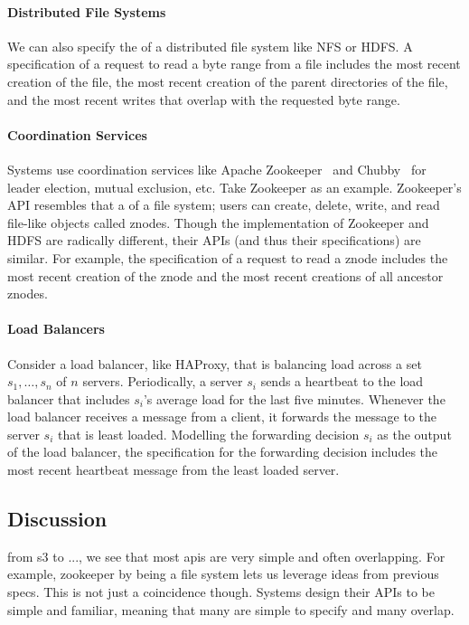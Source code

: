 \paragraph{Distributed File Systems}
We can also specify the \watprovenance{} of a distributed file system like NFS
or HDFS. A \watprovenance{} specification of a request to read a byte range
from a file includes the most recent creation of the file, the most recent
creation of the parent directories of the file, and the most recent writes that
overlap with the requested byte range.

\paragraph{Coordination Services}
Systems use coordination services like Apache
Zookeeper~\cite{hunt2010zookeeper} and Chubby~\cite{burrows2006chubby} for
leader election, mutual exclusion, etc. Take Zookeeper as an example.
Zookeeper's API resembles that a of a file system; users can create, delete,
write, and read file-like objects called znodes. Though the implementation of
Zookeeper and HDFS are radically different, their APIs (and thus their
\watprovenance{} specifications) are similar. For example, the \watprovenance{}
specification of a request to read a znode includes the most recent creation of
the znode and the most recent creations of all ancestor znodes.

\paragraph{Load Balancers}
Consider a load balancer, like HAProxy, that is balancing load across a set
$s_1, \ldots, s_n$ of $n$ servers. Periodically, a server $s_i$ sends a
heartbeat to the load balancer that includes $s_i$'s average load for the last
five minutes. Whenever the load balancer receives a message from a client, it
forwards the message to the server $s_i$ that is least loaded. Modelling the
forwarding decision $s_i$ as the output of the load balancer, the
\watprovenance{} specification for the forwarding decision includes the most
recent heartbeat message from the least loaded server.

\subsection{Discussion}
from s3 to ..., we see that most apis are very simple and often overlapping. For example, zookeeper by being a file system lets us leverage ideas from previous specs. This is not just a coincidence though. Systems design their APIs to be simple and familiar, meaning that many are simple to specify and many overlap.

